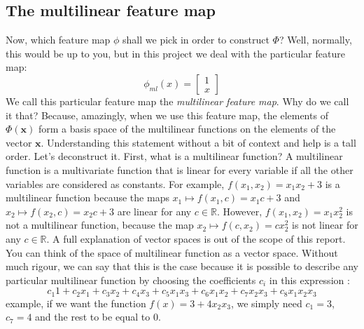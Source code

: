 \documentclass{article}
\theoremstyle{definition}
\theoremstyle{definition}
\begin{document}
\subsection{The multilinear feature map}
Now, which feature map $\phi$ shall we pick in order to construct $\Phi$?
Well, normally, this would be up to you, but in this project we deal with the particular feature map:
\begin{equation}
    \phi_{ml}(x) = 
    \begin{bmatrix}
        1 \\
        x
    \end{bmatrix}
\end{equation}
We call this particular feature map the \emph{multilinear feature map}.
Why do we call it that? Because, amazingly, when we use this feature map, the elements of $\Phi(\mathbf{x})$ form a basis space of the multilinear functions on the elements of the vector $\mathbf{x}$.
Understanding this statement without a bit of context and help is a tall order. Let's deconstruct it.
First, what is a multilinear function? A multilinear function is a multivariate function that is linear for every variable if all the other variables are considered as constants. For example, $f(x_1, x_2) = x_1 x_2 + 3$ is a multilinear function because the maps $x_1 \mapsto f(x_1, c) = x_1c  + 3$ and $x_2 \mapsto f(x_2, c) = x_2c  + 3$ are linear for any $c \in \mathbb{\mathbb{R}}$. However, $f(x_1, x_2) = x_1 x_2^2$ is not a multilinear function, because the map $x_2 \mapsto f(c, x_2) = c x_2^2$ is not linear for any $c \in \mathbb{R}$. A full explanation of vector spaces is out of the scope of this report. You can think of the space of multilinear function as a vector space. Without much rigour, we can say that this is the case because it is possible to describe any particular multilinear function by choosing the coefficients $c_i$ in this expression :
\begin{equation}\label{eq:basis}
    c_1 1 + c_2 x_1 + c_3 x_2 + c_4 x_3  + c_5 x_1 x_3 + c_6 x_1 x_2 + c_7 x_2 x_3 + c_8 x_1 x_2 x_3
\end{equation}
 example, if we want the function $f(x) = 3 + 4 x_2 x_3$, we simply need $c_1 = 3$, $c_7 = 4$ and the rest to be equal to $0$.
\end{document}
